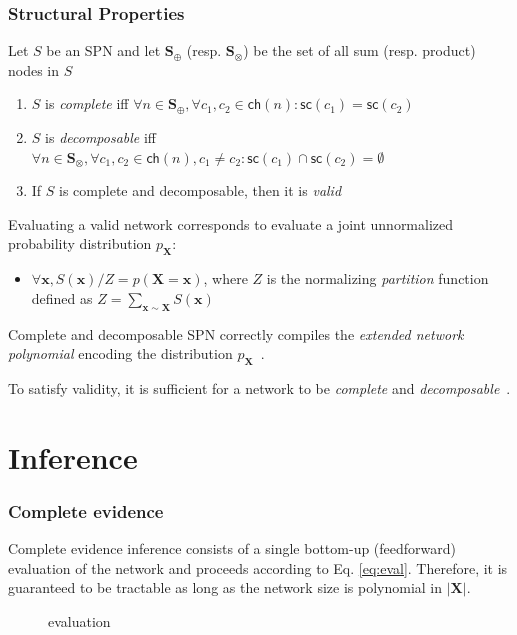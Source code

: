 \documentclass[10pt, t, xcolor={usenames,dvipsnames,svgnames}, compress]{beamer}
\begin{document}
\begin{frame}
  \frametitle{Structural Properties}
  Let $S$ be an SPN and let $\mathbf S_{\oplus}$ (resp. $\mathbf S_{\otimes}$) be the set of all sum
  (resp. product) nodes in $S$
\begin{enumerate}  
\item    $S$ is \emph{complete} iff $\forall n\in
  \mathbf S_{\oplus},\forall c_{1}, c_{2}\in \mathsf{ch}(n):
  \mathsf{sc}(c_{1})=\mathsf{sc}(c_{2})$
\item    $S$ is \emph{decomposable} iff $\forall n\in
  \mathbf S_{\otimes},\forall c_{1}, c_{2}\in \mathsf{ch}(n), c_{1}\neq c_{2}:
  \mathsf{sc}(c_{1})\cap\mathsf{sc}(c_{2})=\emptyset$
\item    If $S$ is complete and decomposable, then it is \emph{valid}
\end{enumerate}  

Evaluating a valid network corresponds to
evaluate a joint unnormalized probability distribution
$p_{\mathbf{X}}$:
\begin{itemize}
\item $\forall\mathbf{x},S(\mathbf{x})/Z=p(\mathbf{X = x})$, where $Z$ is the
normalizing \emph{partition} function defined as
$Z=\sum_{\mathbf{x}\sim \mathbf{X}}S(\mathbf{x})$
\end{itemize}

Complete and decomposable SPN correctly compiles the
\emph{extended network polynomial} encoding
the distribution $p_{\mathbf{X}}$~\cite{Peharz2015a}.

To satisfy validity, it is sufficient for a network to be
\emph{complete} and \emph{decomposable}~\cite{Darwiche2009,Poon2011}.

\end{frame}

\section{Inference}
{
  \begin{frame}[c]
    \sectionpage
  \end{frame}
}

\begin{frame}
  \frametitle{Complete evidence}

Complete evidence inference consists of a single bottom-up
(feedforward) evaluation of the network and proceeds according to
Eq. \ref{eq:eval}.
%
Therefore, it is guaranteed to be tractable
as long as the network size is polynomial in $|\mathbf{X}|$.
\begin{figure}
\caption{evaluation}
\end{figure}
\end{frame}
\end{document}
